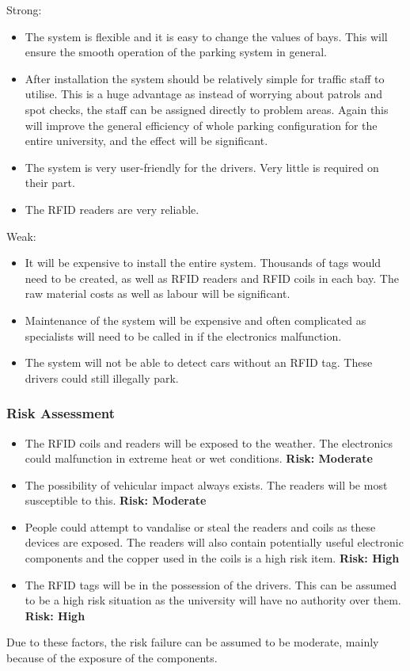 Strong:

\begin{itemize}
\item The system is flexible and it is easy to change the values of bays. This will ensure the smooth
operation of the parking system in general.
\item After installation the system should be relatively simple for traffic staff to utilise. This is a
huge advantage as instead of worrying about patrols and spot checks, the staff can be
assigned directly to problem areas. Again this will improve the general efficiency of whole
parking configuration for the entire university, and the effect will be significant.
\item The system is very user-friendly for the drivers. Very little is required on their part.
\item The RFID readers are very reliable.
\end{itemize}

Weak:
\begin{itemize}
\item It will be expensive to install the entire system. Thousands of tags would need to be created,
as well as RFID readers and RFID coils in each bay. The raw material costs as well as labour
will be significant.
\item Maintenance of the system will be expensive and often complicated as specialists will need
to be called in if the electronics malfunction.
\item The system will not be able to detect cars without an RFID tag. These drivers could still
illegally park.
\end{itemize}

\subsubsection{Risk Assessment}
\begin{itemize}
\item The RFID coils and readers will be exposed to the weather. The electronics could
malfunction in extreme heat or wet conditions. \textbf{Risk: Moderate}
\item The possibility of vehicular impact always exists. The readers will be most susceptible to this.
\textbf{Risk: Moderate}
\item People could attempt to vandalise or steal the readers and coils as these devices are
exposed. The readers will also contain potentially useful electronic components and the
copper used in the coils is a high risk item. \textbf{Risk: High}
\item The RFID tags will be in the possession of the drivers. This can be assumed to be a high risk
situation as the university will have no authority over them. \textbf{Risk: High}
\end{itemize}
Due to these factors, the risk failure can be assumed to be moderate, mainly because of the
exposure of the components.

